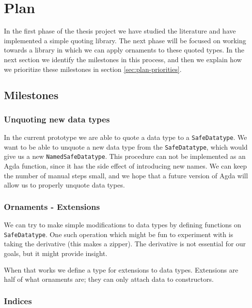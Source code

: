 \section{Plan}\label{sec:plan}

In the first phase of the thesis project we have studied the
literature and have implemented a simple quoting library.
The next phase will be focused on working towards a library in which
we can apply ornaments to these quoted types.
In the next section we identify the milestones in this process, and
then we explain how we prioritize these milestones in section
\ref{sec:plan-priorities}.

\subsection{Milestones}

\subsubsection{Unquoting new data types}\label{sec:plan-new-types}

In the current prototype we are able to quote a data type to a
\texttt{SafeDatatype}.
We want to be able to unquote a new data type from the
\texttt{SafeDatatype}, which would give us a new
\texttt{NamedSafeDatatype}.
This procedure can not be implemented as an Agda function, since it
has the side effect of introducing new names.
We can keep the number of manual steps small, and we hope that a
future version of Agda will allow us to properly unquote data types.

\subsubsection{Ornaments - Extensions}\label{sec:plan-extensions}

We can try to make simple modifications to data types by defining
functions on \texttt{SafeDatatype}.
One such operation which might be fun to experiment with is taking the
derivative (this makes a zipper).
The derivative is not essential for our goals, but it might provide insight.

When that works we define a type for extensions to data types.
Extensions are half of what ornaments are; they can only attach data
to constructors.

\subsubsection{Indices}\label{sec:plan-indices}


